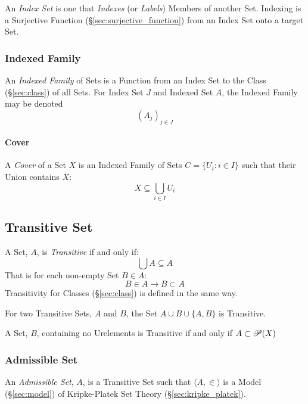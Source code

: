 An \emph{Index Set} is one that \emph{Indexes} (or \emph{Labels})
Members of another Set. Indexing is a Surjective Function
(\S\ref{sec:surjective_function}) from an Index Set onto a target Set.



\subsubsection{Indexed Family}\label{sec:indexed_family}

An \emph{Indexed Family} of Sets is a Function from an Index Set to
the Class (\S\ref{sec:class}) of all Sets. For Index Set $J$ and
Indexed Set $A$, the Indexed Family may be denoted
\[
  (A_j)_{j \in J}
\]



\paragraph{Cover}\label{sec:cover}\hfill

A \emph{Cover} of a Set $X$ is an Indexed Family of Sets $C = \{ U_i :
i \in I \}$ such that their Union contains $X$:
\[
  X \subseteq \bigcup_{i \in I} U_i
\]



\subsection{Transitive Set}\label{sec:transitive_set}

A Set, $A$, is \emph{Transitive} if and only if:
\[
  \bigcup A \subseteq A
\]
That is for each non-empty Set $B \in A$:
\[
  B \in A \rightarrow B \subset A
\]
Transitivity for Classes (\S\ref{sec:class}) is defined in the same
way.

For two Transitive Sets, $A$ and $B$, the Set $A \cup B \cup \{A,B\}$
is Transitive.

A Set, $B$, containing no Urelements is Transitive if and only if $A
\subset \mathscr{P}(X)$



\subsubsection{Admissible Set}\label{sec:admissible_set}

An \emph{Admissible Set}, $A$, is a Transitive Set such that $\langle A, \in
\rangle$ is a Model (\S\ref{sec:model}) of Kripke-Platek Set Theory
(\S\ref{sec:kripke_platek}).

